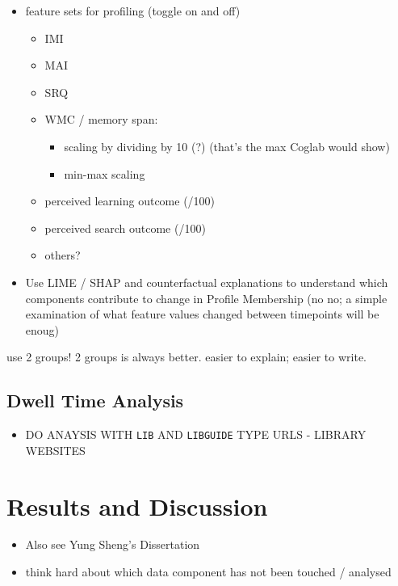 \documentclass[letterpaper, nobind]{templates/ociamthesis}
\providecommand{\tightlist}{%
  \setlength{\itemsep}{0pt}\setlength{\parskip}{0pt}}
\begin{document}
\begin{itemize}
\tightlist
\item
  feature sets for profiling (toggle on and off)

  \begin{itemize}
  \tightlist
  \item
    IMI
  \item
    MAI
  \item
    SRQ
  \item
    WMC / memory span:

    \begin{itemize}
    \tightlist
    \item
      scaling by dividing by 10 (?) (that's the max Coglab would show)
    \item
      min-max scaling
    \end{itemize}
  \item
    perceived learning outcome (/100)
  \item
    perceived search outcome (/100)
  \item
    others?
  \end{itemize}
\item
  Use LIME / SHAP and counterfactual explanations to understand which components contribute to change in Profile Membership (no no; a simple examination of what feature values changed between timepoints will be enoug)
\end{itemize}

use 2 groups! 2 groups is always better. easier to explain; easier to write.

\hypertarget{dwell-time-analysis}{%
\section{Dwell Time Analysis}\label{dwell-time-analysis}}

\begin{itemize}
\tightlist
\item
  DO ANAYSIS WITH \texttt{LIB} AND \texttt{LIBGUIDE} TYPE URLS - LIBRARY WEBSITES
\end{itemize}

\hypertarget{results-and-discussion}{%
\chapter{Results and Discussion}\label{results-and-discussion}}

\begin{itemize}
\tightlist
\item
  Also see Yung Sheng's Dissertation
\item
  think hard about which data component has not been touched / analysed
\end{itemize}
\end{document}
